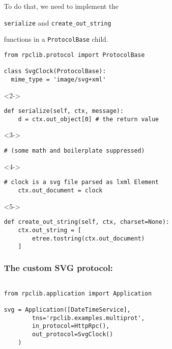 \documentclass{beamer}
\begin{document}
\begin{frame}
  \LARGE
  \begin{center}
    To do that, we need to implement the

    \bigskip

    \texttt{serialize} and \texttt{create\_out\_string}

    \bigskip

    functions in a \texttt{ProtocolBase} child.
  \end{center}
\end{frame}

\begin{frame}[fragile]
  \small
  \begin{lstlisting}[frame=none]
from rpclib.protocol import ProtocolBase

class SvgClock(ProtocolBase):
  mime_type = 'image/svg+xml'
  \end{lstlisting}

\begin{uncoverenv}<2->
  \begin{lstlisting}[frame=none]
  def serialize(self, ctx, message):
    d = ctx.out_object[0] # the return value
  \end{lstlisting}
\end{uncoverenv}
\begin{uncoverenv}<3->
  \begin{lstlisting}[frame=none]
    # (some math and boilerplate suppressed)
  \end{lstlisting}
\end{uncoverenv}
\begin{uncoverenv}<4->
  \begin{lstlisting}[frame=none]
    # clock is a svg file parsed as lxml Element
    ctx.out_document = clock
  \end{lstlisting}
\end{uncoverenv}

\begin{uncoverenv}<5->
  \begin{lstlisting}[frame=none]
  def create_out_string(self, ctx, charset=None):
    ctx.out_string = [
        etree.tostring(ctx.out_document)
    ]
  \end{lstlisting}
\end{uncoverenv}
\end{frame}

\begin{frame}[fragile]
\frametitle{The custom SVG protocol:}
\begin{lstlisting}[emph={SvgClock}]

from rpclib.application import Application

svg = Application([DateTimeService],
        tns='rpclib.examples.multiprot',
        in_protocol=HttpRpc(),
        out_protocol=SvgClock()
    )

\end{lstlisting}

\end{frame}
\end{document}
